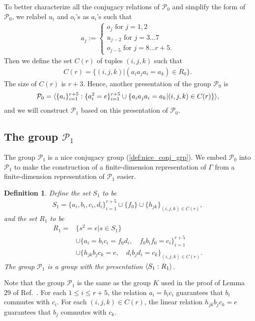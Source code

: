 \documentclass[11pt,letterpaper]{article}
\DeclarePairedDelimiter{\ip}{\langle}{\rangle}
\newcommand{\1}{\mathbb{1}}
\newcommand{\Pg}{\mathcal{P}}
\newtheorem{definition}[theorem]{Definition}
\theoremstyle{definition}
\begin{document}
To better characterize all the conjugacy
relations of $\Pg_0$ and simplify the form of $\Pg_0$, 
we relabel $u_i$ and $o_i$'s as $a_i$'s such that
\begin{align}
	a_j := 
	\begin{cases}
	 o_j \text{ for } j = 1,2 \\
	 u_{j-2} \text{ for } j = 3\dots 7 \\
	 o_{j-5} \text{ for } j = 8 \dots r+5.
	\end{cases}
\end{align}
Then we define the set $C(r)$ of tuples $(i,j,k)$ such that
\begin{align}
\label{eq:cr}
	C(r) = \{ (i,j,k) |  (a_ia_ja_i = a_k) \in R_0 \}.
\end{align}
The size of $C(r)$ is $r+3$. 
Hence, another presentation of the group $\Pg_0$ is
\begin{align*}
    \Pg_0 = \ip{ \{a_i\}_{i=1}^{r+5} : \{a_i^2 =e \}_{i=1}^{r+5} \cup \{ a_ia_ja_i = a_k \vert (i,j,k) \in C(r)\}},
\end{align*}
and we will construct $\Pg_1$ based on this presentation of $\Pg_0$.

\subsection{The group $\Pg_1$}
\label{sec:g1}
The group $\Pg_1$ is a nice conjugacy group (\cref{def:nice_conj_grp}).
We embed $\Pg_0$ into $\Pg_1$ to
make the construction of a finite-dimension representation of $\Gamma$ from
a finite-dimension representation of $\Pg_1$ easier.
\begin{definition}
\label{def:g1}
Define the set $S_1$ to be
\begin{align*}
	S_1 = \{a_i, b_i, c_i, d_i\}_{i=1}^{r+5} \cup \{ f_0 \} \cup \{h_{jk}\}_{(i,j,k) \in C(r)},
\end{align*}
and the set $R_1$ to be
\begin{align*}
	R_1 = &\{ s^2 = e \vert s \in S_1\}\\ 
	&\cup 
	\{a_i = b_ic_i = f_0d_i, \quad f_0b_if_0 =c_i\}_{i= 1}^{r+5} \\ 
	&\cup
	\{h_{jk}b_j c_k = e, \quad d_ib_jd_i = c_k\}_{(i,j,k) \in C(r)}.
\end{align*}
The group $\Pg_1$ is a group with the presentation $\ip{S_1 : R_1}$.
\end{definition}
Note that the group $\Pg_1$ is the same as the group $K$ used in the proof of Lemma $29$ of Ref.~\cite{slofstra2017}.
For each $1 \leq i \leq r+5$, the relation $a_i = b_ic_i$ guarantees that $b_i$ commutes with $c_i$.
For each $(i,j,k) \in C(r)$, the linear relation $h_{jk} b_j c_k = e$ guarantees that
$b_j$ commutes with $c_k$.
\end{document}
